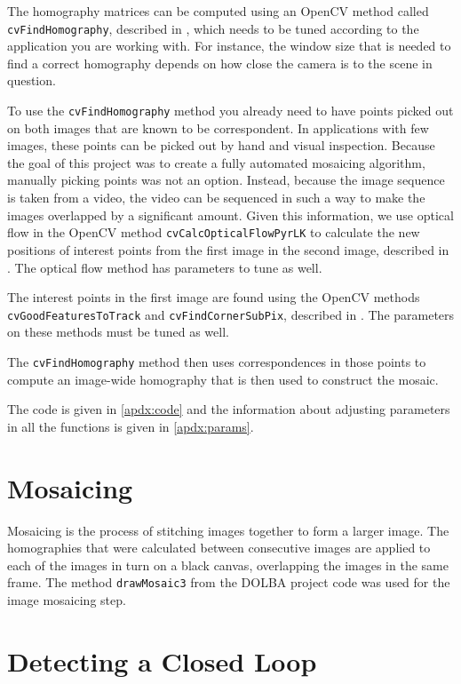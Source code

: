 \documentclass{article}
\begin{document}
The homography matrices can be computed using an OpenCV method called
\verb|cvFindHomography|, described in \cite{cvhomog}, which needs to be tuned
according to the application you are working with. For instance, the window
size that is needed to find a correct homography depends on how close the
camera is to the scene in question. 

To use the \verb|cvFindHomography| method you already need to have points
picked out on both images that are known to be correspondent. In applications
with few images, these points can be picked out by hand and visual inspection.
Because the goal of this project was to create a fully automated mosaicing
algorithm, manually picking points was not an option. Instead, because the
image sequence is taken from a video, the video can be sequenced in such a way
to make the images overlapped by a significant amount. Given this information,
we use optical flow in the OpenCV method \verb|cvCalcOpticalFlowPyrLK| to
calculate the new positions of interest points from the first image in the
second image, described in \cite{opticalflow}. The optical flow method has parameters to tune as well. 

The interest points in the first image are found using the OpenCV methods
\verb|cvGoodFeaturesToTrack| and \verb|cvFindCornerSubPix|, described in
\cite{points}. The parameters on these methods must be tuned as well. 

The \verb|cvFindHomography| method then uses correspondences in those points to
compute an image-wide homography that is then used to construct the mosaic. 

The code is given in \ref{apdx:code} and the information about adjusting parameters in all the functions is given in \ref{apdx:params}.

\section{Mosaicing}

Mosaicing is the process of stitching images together to form a larger image.
The homographies that were calculated between consecutive images are applied to
each of the images in turn on a black canvas, overlapping the images in the
same frame. The method \texttt{drawMosaic3} from the DOLBA project code was
used for the image mosaicing step.  

\section{Detecting a Closed Loop}
\end{document}
